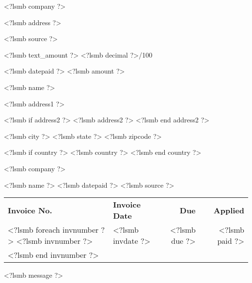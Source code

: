 \documentclass[a4paper,oneside]{article}
\begin{document}
\fontsize{9pt}{9pt}\selectfont

\parbox[t]{12cm}{
  <?lsmb company ?>

  <?lsmb address ?>}
\hfill
\parbox[t]{6cm}{\hfill <?lsmb source ?>}

\vspace*{0.6cm}

<?lsmb text_amount ?> \dotfill <?lsmb decimal ?>/100 \makebox[0.5cm]{\hfill}

\vspace{0.5cm}

\hfill <?lsmb datepaid ?> \makebox[2cm]{\hfill} <?lsmb amount ?>

\vspace{0.5cm}

<?lsmb name ?>

<?lsmb address1 ?>

<?lsmb if address2 ?>
<?lsmb address2 ?>
<?lsmb end address2 ?>

<?lsmb city ?> <?lsmb state ?> <?lsmb zipcode ?>

<?lsmb if country ?>
<?lsmb country ?>
<?lsmb end country ?>

\vspace{2.8cm}

<?lsmb company ?>

\vspace{0.5cm}

<?lsmb name ?> \hfill <?lsmb datepaid ?> \hfill <?lsmb source ?>

\vspace{0.5cm}
\begin{tabularx}{\textwidth}{lXrr@{}}
\textbf{Invoice No.} & \textbf{Invoice Date}
  & \textbf{Due} & \textbf{Applied} \\
<?lsmb foreach invnumber ?>
<?lsmb invnumber ?> & <?lsmb invdate ?> \dotfill
  & <?lsmb due ?> & <?lsmb paid ?> \\
<?lsmb end invnumber ?>
\end{tabularx}

\vfill
<?lsmb message ?>
\end{document}
